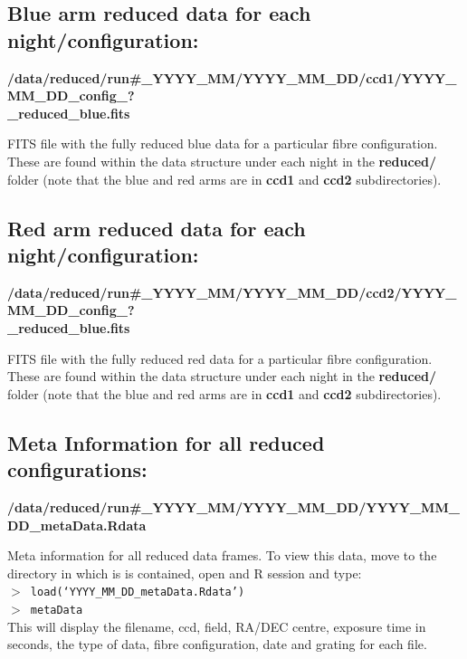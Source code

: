 \documentclass[12pt]{article}
\begin{document}
  
\subsection{Blue arm reduced data for each night/configuration:} 
   
   \textbf{/data/reduced/run\#\_YYYY\_MM/YYYY\_MM\_DD/ccd1/YYYY\_MM\_DD\_config\_? \\ \_reduced\_blue.fits} 
   
 FITS file with the fully reduced blue data for a particular fibre configuration. These are found within the data structure under each night in the \textbf{reduced/} folder (note that the blue and red arms are in \textbf{ccd1} and \textbf{ccd2} subdirectories). 

 
  
\subsection{Red arm reduced data for each night/configuration:} 
  
  \textbf{/data/reduced/run\#\_YYYY\_MM/YYYY\_MM\_DD/ccd2/YYYY\_MM\_DD\_config\_? \\ \_reduced\_blue.fits} 
  
  FITS file with the fully reduced red data for a particular fibre configuration. These are found within the data structure under each night in the \textbf{reduced/} folder (note that the blue and red arms are in \textbf{ccd1} and \textbf{ccd2} subdirectories). 

 

\subsection{Meta Information for all reduced configurations:} 
 
 \textbf{/data/reduced/run\#\_YYYY\_MM/YYYY\_MM\_DD/YYYY\_MM\_DD\_metaData.Rdata} 
 
 Meta information for all reduced data frames. To view this data, move to the directory in which is is contained, open and R session and type:\\
 

\hspace{10mm}  \texttt{$>$ load(`YYYY\_MM\_DD\_metaData.Rdata')}\\

\hspace{10mm}  \texttt{$>$ metaData}\\

 This will display the filename, ccd, field, RA/DEC centre, exposure time in seconds, the type of data, fibre configuration, date and grating for each file.  
  
\end{document}
